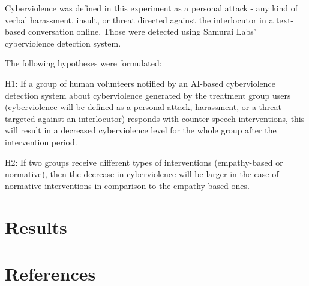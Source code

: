 \documentclass[
  10pt,
  dvipsnames,enabledeprecatedfontcommands]{scrartcl}
\begin{document}
Cyberviolence was defined in this experiment as a personal attack - any
kind of verbal harassment, insult, or threat directed against the
interlocutor in a text-based conversation online. Those were detected
using Samurai Labs' cyberviolence detection system.

The following hypotheses were formulated:

H1: If a group of human volunteers notified by an AI-based cyberviolence
detection system about cyberviolence generated by the treatment group
users (cyberviolence will be defined as a personal attack, harassment,
or a threat targeted against an interlocutor) responds with
counter-speech interventions, this will result in a decreased
cyberviolence level for the whole group after the intervention period.

H2: If two groups receive different types of interventions
(empathy-based or normative), then the decrease in cyberviolence will be
larger in the case of normative interventions in comparison to the
empathy-based ones.

\hypertarget{results}{%
\section{Results}\label{results}}

\hypertarget{references}{%
\section*{References}\label{references}}

\vspace{-3mm}
\end{document}
